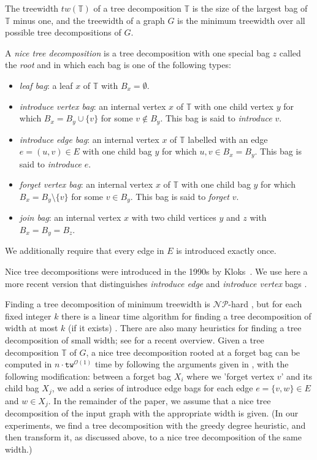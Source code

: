 \documentclass{llncs}
\begin{document}
The treewidth $tw(\mathbb{T})$ of a tree decomposition $\mathbb{T}$ is the size of the largest bag of $\mathbb{T}$ minus one, and the treewidth of a graph $G$ is the minimum treewidth over all possible tree decompositions of $G$.
\begin{definition}\label{ntd} A \emph{nice tree decomposition}  is a tree decomposition with one special bag $z$ called the \emph{root} and in which each bag is one of the following types:
\begin{itemize}
\item \emph{leaf bag}: a leaf $x$ of $\mathbb{T}$ with $B_{x} = \emptyset$.
\item \emph{introduce vertex bag}: an internal vertex $x$ of $\mathbb{T}$ with one child vertex $y$ for which $B_{x} = B_{y}\cup \{v\}$ for some $v\notin B_{y}$. This bag is said to \emph{introduce} $v$.
\item \emph{introduce edge bag}: an internal vertex $x$ of $\mathbb{T}$ labelled with an edge $e = (u, v) \in E$ with one child bag $y$ for which $u, v \in B_{x} = B_{y}$. This bag is said to \emph{introduce} $e$.
\item \emph{forget vertex bag}: an internal vertex $x$ of $\mathbb{T}$ with one child bag $y$ for which $B_{x} = B_{y} \setminus\{v\}$ for some $v\in B_{y}$. This bag is said to \emph{forget} $v$.
\item \emph{join bag}: an internal vertex $x$ with two child vertices $y$ and $z$ with $B_{x} = B_{y} = B_{z}$.
\end{itemize}
We additionally require that every edge in $E$ is introduced exactly once.
\end{definition}

Nice tree decompositions were introduced in the 1990s by Kloks~\cite{Kloks93}. We use here a more
recent version that distinguishes {\em introduce edge} and {\em introduce vertex} bags \cite{CyganNPPRW11}.

Finding a tree decomposition of minimum treewidth is $\mathcal{NP}$-hard \cite{ArnborgCP87},
but for each fixed integer $k$ there is a linear time algorithm for finding a tree decomposition of width at most $k$ (if it exists) \cite{Bodlaender96}.
There are also many heuristics for finding a tree decomposition of small width; see \cite{BodlaenderK10} for
a recent overview.
Given a tree decomposition $\mathbb{T}$ of $G$, a nice tree decomposition rooted at a forget bag can be 
computed in $n \cdot \texttt{tw}^{\mathcal{O}(1)}$ time by following the arguments given in \cite{Kloks93}, with the
following modification: between a forget bag $X_i$ where we 'forget vertex $v$'  and its child bag $X_j$, we add a series of introduce edge bags for each edge $e=\{v,w\}\in E$
and $w\in X_j$.
In the remainder of the paper, we assume that a nice tree decomposition of the input graph with the appropriate width is given.
(In our experiments, we find a tree decomposition with the greedy degree heuristic, and then transform it, as discussed above, to a nice
tree decomposition of the same width.)
\end{document}
